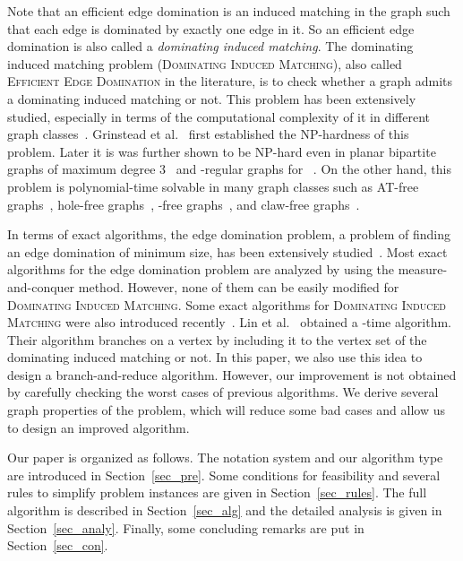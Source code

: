 \documentclass{elsart_TR2}
\begin{document}
Note that an efficient edge domination is an induced matching in the graph such that each  edge is dominated by exactly one edge in it.
So an efficient edge domination is also called a \emph{dominating induced matching}. The dominating induced matching problem (\textsc{Dominating Induced Matching}),
also called \textsc{Efficient Edge Domination} in the literature, is to check whether a graph admits a dominating induced matching or not. This problem has been extensively studied, especially
in terms of the computational complexity of it in different graph
 classes~\cite{BHN:EEDhole-free,BM:DIMp7,CKL:DIM,GSSH:EED,PandEED,EED:bpermutation}.
Grinstead et al.~\cite{GSSH:EED} first established the NP-hardness of this problem.
Later it is was further shown to be NP-hard even in planar bipartite graphs of maximum degree 3~\cite{BHN:EEDhole-free} and -regular graphs for ~\cite{CCDS:EEDRegularGraph}.
On the other hand, this problem is polynomial-time solvable in  many graph classes such as
AT-free graphs~\cite{BLR:EEDhypergraph}, hole-free graphs~\cite{BHN:EEDhole-free}, -free graphs~\cite{BM:DIMp7},
and claw-free graphs~\cite{CKL:DIM}.

In terms of exact algorithms, the edge domination problem,
a problem of finding an edge domination of minimum size, has been extensively studied~\cite{kn:rooij,xn:eds}. Most exact algorithms for the edge domination problem are analyzed by using the measure-and-conquer method. However, none of them can be easily modified for
\textsc{Dominating Induced Matching}.
Some exact algorithms for \textsc{Dominating Induced Matching} were also introduced recently~\cite{LMS:DIMexact,LMS:DIMexact_odd}. Lin et al.~\cite{LMS:DIMexact} obtained a -time algorithm. Their algorithm branches on a vertex by including it to the vertex set of the dominating induced matching or not.
In this paper, we also use this idea to design a branch-and-reduce algorithm. However, our improvement is not obtained by carefully
checking the worst cases of previous algorithms. We derive several graph properties of the problem, which will reduce some bad cases and allow us to design an improved algorithm.


Our paper is organized as follows. The notation system and our algorithm type are introduced in Section~\ref{sec_pre}.
Some conditions for feasibility and several rules to simplify problem  instances are given in Section~\ref{sec_rules}. The full algorithm is described in Section~\ref{sec_alg} and
the detailed analysis is given in Section~\ref{sec_analy}.
Finally, some concluding remarks are put in Section~\ref{sec_con}.
\end{document}
